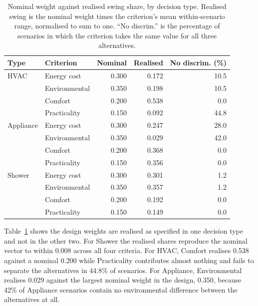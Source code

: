 \FloatBarrier

\begin{table}[htbp]
\centering
\begin{threeparttable}
\footnotesize
\caption{Nominal weight against realised swing share, by decision type.
Realised swing is the nominal weight times the criterion's mean within-scenario
range, normalised to sum to one. ``No discrim.'' is the percentage of scenarios
in which the criterion takes the same value for all three alternatives.}
\label{tab:realised_weight}
\begin{tabular}{@{}llrrr@{}}
\toprule
Type & Criterion & Nominal & Realised & No discrim. (\%) \\
\midrule
HVAC & Energy cost    & 0.300 & 0.172 & 10.5 \\
     & Environmental  & 0.350 & 0.198 & 10.5 \\
     & Comfort        & 0.200 & 0.538 & 0.0  \\
     & Practicality   & 0.150 & 0.092 & 44.8 \\
\midrule
Appliance & Energy cost   & 0.300 & 0.247 & 28.0 \\
          & Environmental & 0.350 & 0.029 & 42.0 \\
          & Comfort       & 0.200 & 0.368 & 0.0  \\
          & Practicality  & 0.150 & 0.356 & 0.0  \\
\midrule
Shower & Energy cost   & 0.300 & 0.301 & 1.2 \\
       & Environmental & 0.350 & 0.357 & 1.2 \\
       & Comfort       & 0.200 & 0.192 & 0.0 \\
       & Practicality  & 0.150 & 0.149 & 0.0 \\
\bottomrule
\end{tabular}
\end{threeparttable}
\end{table}

Table~\ref{tab:realised_weight} shows the design weights are realised as
specified in one decision type and not in the other two. For Shower the
realised shares reproduce the nominal vector to within 0.008 across all four
criteria. For HVAC, Comfort realises 0.538 against a nominal 0.200 while
Practicality contributes almost nothing and fails to separate the alternatives
in 44.8\% of scenarios. For Appliance, Environmental realises 0.029 against the
largest nominal weight in the design, 0.350, because 42\% of Appliance
scenarios contain no environmental difference between the alternatives at all.

